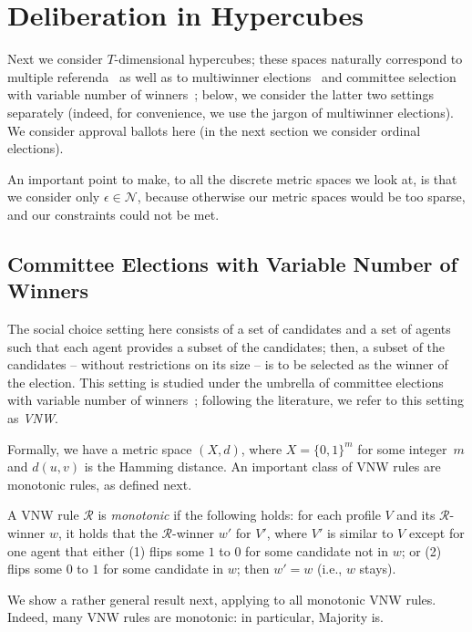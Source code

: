 \documentclass[runningheads,envcountsame]{llncs}
\begin{document}
\section{Deliberation in Hypercubes}\label{section:hypercubes}

Next we consider $T$-dimensional hypercubes; these spaces naturally correspond to multiple referenda~\cite{ma-comsoc} as well as to multiwinner elections~\cite{mwchapter} and committee selection with variable number of winners~\cite{faliszewski2020multiwinner}; below, we consider the latter two settings separately (indeed, for convenience, we use the jargon of multiwinner elections). We consider approval ballots here (in the next section we consider ordinal elections).

An important point to make, to all the discrete metric spaces we look at, is that we consider only $\epsilon \in \mathcal{N}$, because otherwise our metric spaces would be too sparse, and our constraints could not be met.

\subsection{Committee Elections with Variable Number of Winners}

The social choice setting here consists of a set of candidates and a set of agents such that each agent provides a subset of the candidates; then, a subset of the candidates -- without restrictions on its size -- is to be selected as the winner of the election.
This setting is studied under the umbrella of committee elections with variable number of winners~\cite{faliszewski2020multiwinner}; following the literature, we refer to this setting as \emph{VNW}.

Formally, we have a metric space $(X, d)$, where $X = \{0, 1\}^m$ for some integer~$m$ and $d(u, v)$ is the Hamming distance.
%
An important class of VNW rules are monotonic rules, as defined next.

\begin{definition}
  A VNW rule $\mathcal{R}$ is \emph{monotonic} if the following holds:
    for each profile $V$ and its $\mathcal{R}$-winner $w$, it holds that the $\mathcal{R}$-winner $w'$ for $V'$, where $V'$ is similar to $V$ except for one agent that either (1) flips some $1$ to $0$ for some candidate not in $w$; or (2) flips some $0$ to $1$ for some candidate in $w$; then $w' = w$ (i.e., $w$ stays).
\end{definition}

We show a rather general result next, applying to all monotonic VNW rules.
%
Indeed, many VNW rules are monotonic:
  in particular, Majority is.
\end{document}
